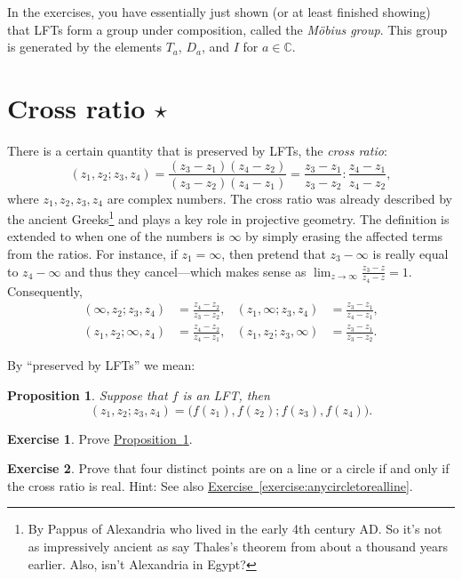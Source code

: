 \documentclass[12pt,openany]{book}
\newcommand{\C}{{\mathbb{C}}}
\newcommand{\myindex}[1]{#1\index{#1}}
\newcommand{\myquote}[1]{``#1''}
\theoremstyle{plain}
\newtheorem{prop}[thm]{Proposition}
\theoremstyle{remark}
\theoremstyle{definition}
\newenvironment{exbox}{%
    \def\FrameCommand{\vrule width 1pt \relax\hspace{10pt}}%
    \MakeFramed{\advance\hsize-\width\FrameRestore}%
}{%
    \endMakeFramed
}
\theoremstyle{exercise}
\newtheorem{exercise}{Exercise}[section]
\theoremstyle{example}
\newcommand{\exerciseref}[1]{\hyperref[#1]{Exercise~\ref*{#1}}}
\newcommand{\propref}[1]{\hyperref[#1]{Proposition~\ref*{#1}}}
\begin{document}
In the exercises, you have essentially just shown (or at least finished
showing) that LFTs form a group under composition,
called the \emph{\myindex{M\"obius group}}.
This group is generated by the elements
$T_a$, $D_a$, and $I$ for $a\in \C$.


\section{Cross ratio \texorpdfstring{$\star$}{*}}

There is a certain quantity that is preserved by LFTs, the
\emph{\myindex{cross ratio}}:
%
\begin{equation*}
(z_1,z_2;z_3,z_4)
=
\frac{(z_3-z_1)(z_4-z_2)}{(z_3-z_2)(z_4-z_1)}
=
\frac{z_3-z_1}{z_3-z_2} : 
\frac{z_4-z_1}{z_4-z_2} ,
\end{equation*}
where $z_1,z_2,z_3,z_4$ are complex numbers.  The cross ratio
was already described by the ancient Greeks\footnote{By
Pappus of Alexandria who
lived in the early 4th century AD\@.  So it's not as impressively ancient as say
Thales's theorem from about a thousand years earlier.  Also, isn't
Alexandria in Egypt?}
and plays a key role in projective geometry.
The definition is extended to when one of the numbers is $\infty$ by simply
erasing the affected terms from the ratios.  For instance, if $z_1=\infty$,
then pretend that $z_3-\infty$
is really equal to $z_4-\infty$ and
thus they cancel---which makes sense as $\lim_{z\to\infty} \frac{z_3-z}{z_4-z} = 1$.
Consequently,
\begin{align*}
(\infty,z_2;z_3,z_4)
& =
\frac{z_4-z_2}{z_3-z_2}
,
&
(z_1,\infty;z_3,z_4)
& =
\frac{z_3-z_1}{z_4-z_1}
,
\\
(z_1,z_2;\infty,z_4)
& =
\frac{z_4-z_2}{z_4-z_1}
,
& 
(z_1,z_2;z_3,\infty)
& =
\frac{z_3-z_1}{z_3-z_2} .
\end{align*}

By \myquote{preserved by LFTs} we mean:

\begin{prop} \label{prop:crossratioinvariant}
Suppose that $f$ is an LFT\@, then
\begin{equation*}
(z_1,z_2;z_3,z_4) =
\bigl(f(z_1),f(z_2);f(z_3),f(z_4)\bigr) .
\end{equation*}
\end{prop}

\begin{exbox}
\begin{exercise}
Prove \propref{prop:crossratioinvariant}.
\end{exercise}

\begin{exercise}
Prove that four distinct points are on a line or a circle if and only if the cross
ratio is real.
Hint: See also \exerciseref{exercise:anycircletorealline}.
\end{exercise}
\end{exbox}
\end{document}
